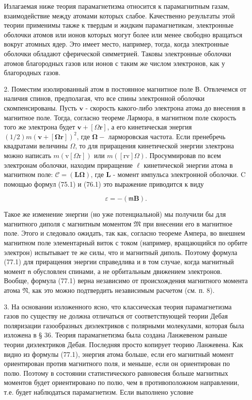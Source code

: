 \documentclass[12pt]{article}
\begin{document}
  Излагаемая ниже теория парамагнетизма относится к парамагнитным газам, взаимодействие между атомами которых слабое. Качественно результаты этой теории применимы также к твердым и жидким парамагнетикам, электронные оболочки атомов или ионов которых могут более или менее свободно вращаться вокруг атомных ядер. Это имеет место, например, тогда, когда электронные оболочки обладают сферической симметрией. Таковы электронные оболочки атомов благородных газов или ионов с таким же числом электронов, как у благородных газов.

  2. Поместим изолированный атом в постоянное магнитное поле В. Отвлечемся от наличия спинов, предполагая, что все спины электронной оболочки скомпенсированы. Пусть $\mathbf{v}$ - скорость какого-либо электрона атома до внесения в магнитное поле. Тогда, согласно теореме Лармора, в магнитном поле скорость того же электрона будет $\mathbf{v}+[\Omega \mathbf{r}]$, а его кинетическая энергия $(1 / 2) m(\mathbf{v}+[\boldsymbol{\Omega r}])^2$, где $\boldsymbol{\Omega}-$ ларморовская частота. Если пренебречь квадратами величины $\Omega$, то для приращения кинетической энергии злектрона можно написать $m(\mathrm{v}[\Omega \mathrm{r}])$ или $m([\mathrm{rv}] \Omega)$. Просуммировав по всем электронам оболочки, находим приращение $\mathscr{\ell}$ кинетической энергии атома в магнитном поле: $\mathcal{C}=(\mathbf{L} \boldsymbol{\Omega})$, где $\mathbf{L}$ - момент импульса электронной оболочки. C помощью формул (75.1) и (76.1) это выражение приводится к виду

  $$
  \mathscr{\varepsilon}=-(\mathfrak{m} \mathbf{B}) .
  $$


  Такое же изменение энергии (но уже потенциальной) мы получили бы для магнитного диполя с магнитным моментом $\mathfrak{M}$ при внесении его в магнитное поле. Этого и следовало ожидать, так как, согласно теореме Ампера, во внешнем магнитном поле элементарный виток с током (например, вращающийся по орбите электрон) испытывает те же силы, что и магнитный диполь. Поэтому формула (77.1) для приращения энергии справедлива и в том случае, когда магнитный момент $\mathfrak{n}$ обусловлен спинами, а не орбитальным движением электронов. Вообще, формула (77.1) верна независимо от происхождения магнитного момента атома $\mathfrak{N}$, как это можно подтвердить независимым расчетом (см. п. 8).

  3. На основании изложенного ясно, что классическая теория парамагнетизма газов по существу не должна отличаться от соответствующей теории Дебая поляризации газообразных диэлектриков с полярными молекулами, которая была изложена в § 36. Теория парамагнетизма была создана Ланжевеном раньше теории диэлектриков Дебая. Последняя просто копирует теорию Ланжевена. Как видно из формулы (77.1), энергия атома больше, если его магнитный момент ориентирован против магнитного поля, и меныше, если он ориентирован по полю. Поэтому в состоянии статистического равновесия больше магнитных моментов будет ориентировано по полю, чем в противоположном направлении, т.е. будет наблюдаться парамагнетизм. Если выполнено условие
\end{document}
